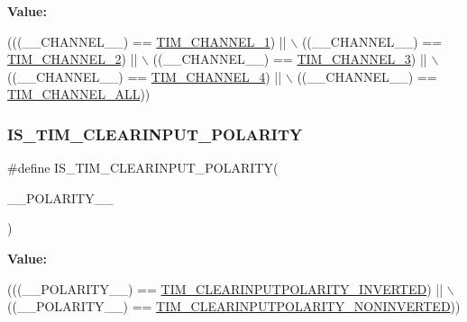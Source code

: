{\bfseries Value\+:}
\begin{DoxyCode}
(((\_\_CHANNEL\_\_) == \hyperlink{group___t_i_m___channel_ga6b1541e4a49d62610899e24bf23f4879}{TIM\_CHANNEL\_1}) || \(\backslash\)
                                            ((\_\_CHANNEL\_\_) == \hyperlink{group___t_i_m___channel_ga33e02d43345a7ac5886f01b39e4f7ccd}{TIM\_CHANNEL\_2}) || \(\backslash\)
                                            ((\_\_CHANNEL\_\_) == \hyperlink{group___t_i_m___channel_ga4ea100c1789b178f3cb46721b7257e2d}{TIM\_CHANNEL\_3}) || \(\backslash\)
                                            ((\_\_CHANNEL\_\_) == \hyperlink{group___t_i_m___channel_gad59ef74820ee8bf77fa1f8d589fde2ac}{TIM\_CHANNEL\_4}) || \(\backslash\)
                                            ((\_\_CHANNEL\_\_) == \hyperlink{group___t_i_m___channel_ga6abf8f9fc695b79d8781ca082dfb48bc}{TIM\_CHANNEL\_ALL}))
\end{DoxyCode}
\mbox{\label{group___t_i_m___private___macros_ga0e0cafe2b21ee029a89cba1a400fa21c}} 
\subsubsection{\texorpdfstring{I\+S\+\_\+\+T\+I\+M\+\_\+\+C\+L\+E\+A\+R\+I\+N\+P\+U\+T\+\_\+\+P\+O\+L\+A\+R\+I\+TY}{IS\_TIM\_CLEARINPUT\_POLARITY}}
{\footnotesize\ttfamily \#define I\+S\+\_\+\+T\+I\+M\+\_\+\+C\+L\+E\+A\+R\+I\+N\+P\+U\+T\+\_\+\+P\+O\+L\+A\+R\+I\+TY(\begin{DoxyParamCaption}\item[{}]{\+\_\+\+\_\+\+P\+O\+L\+A\+R\+I\+T\+Y\+\_\+\+\_\+ }\end{DoxyParamCaption})}

{\bfseries Value\+:}
\begin{DoxyCode}
(((\_\_POLARITY\_\_) == \hyperlink{group___t_i_m___clear_input___polarity_ga02e0d10a2cf90016d1a8be1931c6c67e}{TIM\_CLEARINPUTPOLARITY\_INVERTED}) || \(\backslash\)
                                                  ((\_\_POLARITY\_\_) == 
      \hyperlink{group___t_i_m___clear_input___polarity_ga53e02f7692e6996389b462219572f2a9}{TIM\_CLEARINPUTPOLARITY\_NONINVERTED}))
\end{DoxyCode}
\mbox{\label{group___t_i_m___private___macros_ga861bb16ad77e0ede52a3d5f296583d0b}} 
